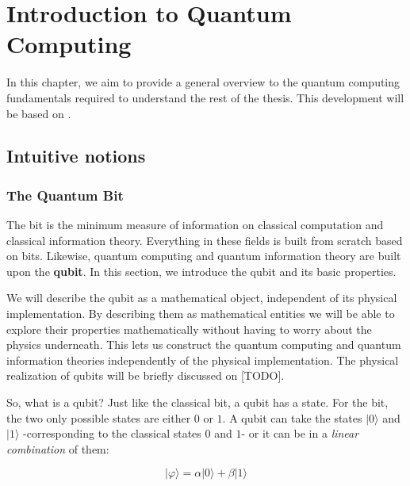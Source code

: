 
\chapter{Introduction to Quantum Computing}

In this chapter, we aim to provide a general overview to the quantum computing fundamentals required to understand the rest of the thesis. This development will be based on \cite{Nielsen2002}.

\section{Intuitive notions}

\subsection{The Quantum Bit}

The bit is the minimum measure of information on classical computation and classical information theory. Everything in these fields is built from scratch based on bits. Likewise, quantum computing and quantum information theory are built upon the \textbf{qubit}. In this section, we introduce the qubit and its basic properties.

We will describe the qubit as a mathematical object, independent of its physical implementation. By describing them as mathematical entities we will be able to explore their properties mathematically without having to worry about the physics underneath. This lets us construct the quantum computing and quantum information theories independently of the physical implementation. The physical realization of qubits will be briefly discussed on [TODO].

So, what is a qubit? Just like the classical bit, a qubit has a state. For the bit, the two only possible states are either $0$ or $1$. A qubit can take the states $|0\rangle$ and $|1\rangle$ -corresponding to the classical states $0$ and $1$- or it can be in a \emph{linear combination} of them:

$$ |\varphi\rangle = \alpha |0\rangle + \beta |1\rangle $$

